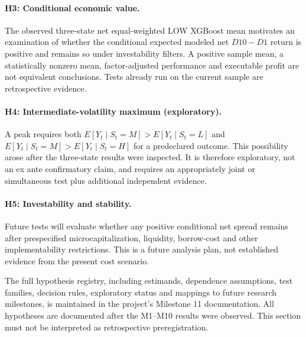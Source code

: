 \paragraph{H3: Conditional economic value.}
The observed three-state net equal-weighted LOW XGBoost mean motivates
an examination of whether the conditional expected modeled net
$D10-D1$ return is positive and remains so under investability filters.
A positive sample mean, a statistically nonzero mean, factor-adjusted
performance and executable profit are not equivalent conclusions.
Tests already run on the current sample are retrospective evidence.

\paragraph{H4: Intermediate-volatility maximum (exploratory).}
A peak requires both
$E[Y_t\mid S_t=M]>E[Y_t\mid S_t=L]$ and
$E[Y_t\mid S_t=M]>E[Y_t\mid S_t=H]$
for a predeclared outcome. This possibility arose after the
three-state results were inspected. It is therefore exploratory, not
an ex ante confirmatory claim, and requires an appropriately joint
or simultaneous test plus additional independent evidence.

\paragraph{H5: Investability and stability.}
Future tests will evaluate whether any positive conditional net
spread remains after prespecified microcapitalization, liquidity,
borrow-cost and other implementability restrictions.
This is a future analysis plan, not established evidence from the
present cost scenario.

The full hypothesis registry, including estimands, dependence assumptions,
test families, decision rules, exploratory status and mappings to future
research milestones, is maintained in the project's Milestone 11
documentation. All hypotheses are documented after the M1--M10
results were observed. This section must not be interpreted as
retrospective preregistration.